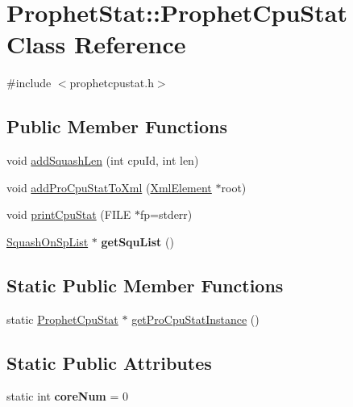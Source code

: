 \hypertarget{classProphetStat_1_1ProphetCpuStat}{
\section{ProphetStat::ProphetCpuStat Class Reference}
\label{classProphetStat_1_1ProphetCpuStat}
}


{\ttfamily \#include $<$prophetcpustat.h$>$}

\subsection*{Public Member Functions}
\begin{DoxyCompactItemize}
\item 
void \hyperlink{classProphetStat_1_1ProphetCpuStat_a80086134fec10a5180c7c7a2c3cc2378}{addSquashLen} (int cpuId, int len)
\item 
void \hyperlink{classProphetStat_1_1ProphetCpuStat_ae57688a78d61dcbe7370fefae03ecb98}{addProCpuStatToXml} (\hyperlink{classXmlElement}{XmlElement} $\ast$root)
\item 
void \hyperlink{classProphetStat_1_1ProphetCpuStat_a8343c003cef10d15351dbafcfc74962e}{printCpuStat} (FILE $\ast$fp=stderr)
\item 
\hypertarget{classProphetStat_1_1ProphetCpuStat_acd041425cbc0d744751b87a121047ab9}{
\hyperlink{classProphetStat_1_1SquashOnSpList}{SquashOnSpList} $\ast$ {\bfseries getSquList} ()}
\label{classProphetStat_1_1ProphetCpuStat_acd041425cbc0d744751b87a121047ab9}

\end{DoxyCompactItemize}
\subsection*{Static Public Member Functions}
\begin{DoxyCompactItemize}
\item 
static \hyperlink{classProphetStat_1_1ProphetCpuStat}{ProphetCpuStat} $\ast$ \hyperlink{classProphetStat_1_1ProphetCpuStat_a1dfee1a62c17b8e9035b68563368702e}{getProCpuStatInstance} ()
\end{DoxyCompactItemize}
\subsection*{Static Public Attributes}
\begin{DoxyCompactItemize}
\item 
\hypertarget{classProphetStat_1_1ProphetCpuStat_aa86b6ecd1908f2dcb64aa4c016758d81}{
static int {\bfseries coreNum} = 0}
\label{classProphetStat_1_1ProphetCpuStat_aa86b6ecd1908f2dcb64aa4c016758d81}

\end{DoxyCompactItemize}
